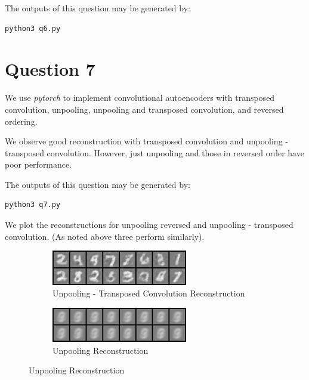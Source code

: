 The outputs of this question may be generated by:

\begin{lstlisting}
python3 q6.py
\end{lstlisting} 

\section{Question 7}

We use \textit{pytorch} to implement convolutional autoencoders with transposed convolution, unpooling, unpooling and transposed convolution, and reversed ordering.

We observe good reconstruction with transposed convolution and unpooling - transposed convolution. However, just unpooling and those in reversed order have poor performance.

The outputs of this question may be generated by:

\begin{lstlisting}
python3 q7.py
\end{lstlisting} 

We plot the reconstructions for unpooling reversed and unpooling - transposed convolution. (As noted above three perform similarly).

\begin{figure}[!htbp]
          \begin{subfigure}
          \centering
          \includegraphics[angle=0,width=0.65\textwidth]{assign-4/logs/q7/deep_autoencoder_upsamp_deconv/image_5.png}
          \caption{Unpooling - Transposed Convolution Reconstruction}
          \end{subfigure}
          \begin{subfigure}
          \centering
          \includegraphics[angle=0,width=0.65\textwidth]{assign-4/logs/q3/deep_autoencoder_sparsity_0.1/image_5.png}
          \caption{Unpooling Reconstruction}
          \end{subfigure}
          \end{figure}
 